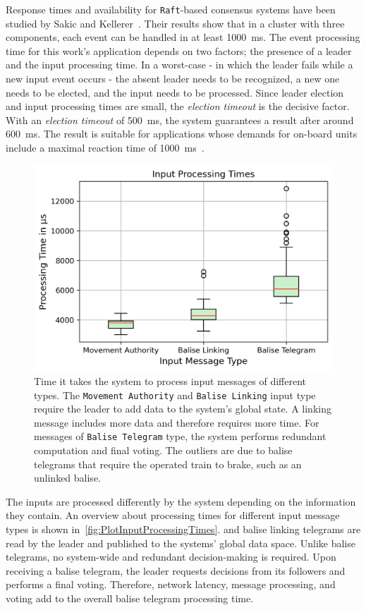 Response times and availability for \texttt{Raft}-based consensus systems have been studied by Sakic and Kellerer~\cite{SakicTimeInConsensus}.
Their results show that in a cluster with three components, each event can be handled in at least 1000~ms.
The event processing time for this work's application depends on two factors; the presence of a leader and the input processing time.
In a worst-case - in which the leader fails while a new input event occurs - the absent leader needs to be recognized, a new one needs to be elected, and the input needs to be processed.
Since leader election and input processing times are small, the \textit{election timeout} is the decisive factor.
With an \textit{election timeout} of 500~ms, the system guarantees a result after around 600~ms.
The result is suitable for  applications whose demands for on-board units include a maximal reaction time of 1000~ms~\cite{ETCS26}.


\begin{figure}[!hb]
	\centering
	\includegraphics[width=0.8\linewidth]{images/plots/inputProcessingTimes}
	\caption{Time it takes the system to process input messages of different types. The \texttt{Movement Authority} and \texttt{Balise Linking} input type require the leader to add data to the system's global state. A linking message includes more data and therefore requires more time. For messages of \texttt{Balise Telegram} type, the system performs redundant computation and final voting. The outliers are due to balise telegrams that require the operated train to brake, such as an unlinked balise.}
	\label{fig:PlotInputProcessingTimes}
\end{figure}

The inputs are processed differently by the system depending on the information they contain.
An overview about processing times for different input message types is shown in~\autoref{fig:PlotInputProcessingTimes}.
 and balise linking telegrams are read by the leader and published to the systems' global data space.
Unlike balise telegrams, no system-wide and redundant decision-making is required.
Upon receiving a balise telegram, the leader requests decisions from its followers and performs a final voting.
Therefore, network latency, message processing, and voting add to the overall balise telegram processing time.

